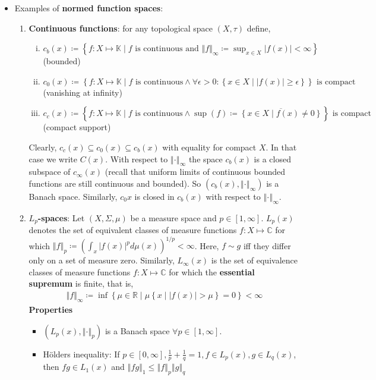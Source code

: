 \documentclass[10pt,a4paper]{article}
\theoremstyle{definition}
\theoremstyle{cor}
\theoremstyle{theorem}
\theoremstyle{lemma}
\theoremstyle{example}
\theoremstyle{remark}
\newcommand{\norm}[1]{\left\Vert #1 \right\Vert}
\begin{document}
\begin{itemize}
\item Examples of \textbf{normed function spaces}:
\begin{enumerate}[(1)]
\item \textbf{Continuous functions}: for any topological space $(X, \tau)$ define,
\begin{enumerate}[(i)]
\item $c_b(x) \coloneqq \left\{ f : X \mapsto \mathbb{K} \mid f \text{ is continuous and } \norm{f}_{\infty} \coloneqq \sup_{x \in X} |f(x)| < \infty \right\}$ (bounded)
\item $c_0(x) \coloneqq \left\{ f: X \mapsto \mathbb{K} \mid f \text{ is continuous} \wedge \forall \epsilon > 0: \left\{x\in X \mid |f(x)| \geq \epsilon\right\} \right\} \text{ is compact}$ (vanishing at infinity)
\item $c_c(x) \coloneqq \left\{ f: X \mapsto \mathbb{K} \mid f \text{ is continuous} \wedge \sup(f) \coloneqq \overline{\left\{x\in X \mid f(x) \neq 0 \right\}}\right\} \text{ is compact}$ (compact support)
\end{enumerate}
Clearly, $c_c(x) \subseteq c_0(x) \subseteq c_b(x)$ with equality for compact $X$. In that case we write $C(x)$. With respect to $\norm{\cdot}_{\infty}$ the space $c_b(x)$ is a closed subspace of $c_{\infty}(x)$ (recall that uniform limits of continuous bounded functions are still continuous and bounded). So $(c_b(x), \norm{\cdot}_{\infty})$ is a Banach space. Similarly, $c_0{x}$ is closed in $c_b(x)$ with respect to $\norm{\cdot}_{\infty}$.
\item \textbf{$L_p$-spaces}: Let $(X, \Sigma, \mu)$ be a measure space and $p\in [1, \infty]$. $L_p(x)$ denotes the set of equivalent classes of measure functions $f: X \mapsto \mathbb{C}$ for which $\norm{f}_p \coloneqq \left(\int_{x} |f(x)|^p d\mu(x)\right)^{1/p} < \infty$. Here, $f\sim g$ iff they differ only on a set of measure zero. Similarly, $L_{\infty}(x)$ is the set of equivalence classes of measure functions $f: X \mapsto \mathbb{C}$ for which the \textbf{essential supremum} is finite, that is, 
\begin{align*}
\norm{f}_{\infty} \coloneqq \inf\left\{ \mu\in\mathbb{R} \mid \mu\left\{ x \mid |f(x)| > \mu\right\} = 0 \right\} < \infty
\end{align*}
\textbf{Properties}
\begin{itemize}
\item $\left(L_p(x), \norm{\cdot}_{p}\right)$ is a Banach space $\forall p \in [1, \infty]$. 
\item H\"{o}lders inequality: If $p\in[0,\infty], \frac{1}{p} + \frac{1}{q} = 1, f\in L_p(x), g\in L_q(x)$, then $fg\in L_1(x)$ and $\norm{fg}_1 \leq \norm{f}_p \norm{g}_q$

\end{itemize}
\end{enumerate}
\end{itemize}
\end{document}
